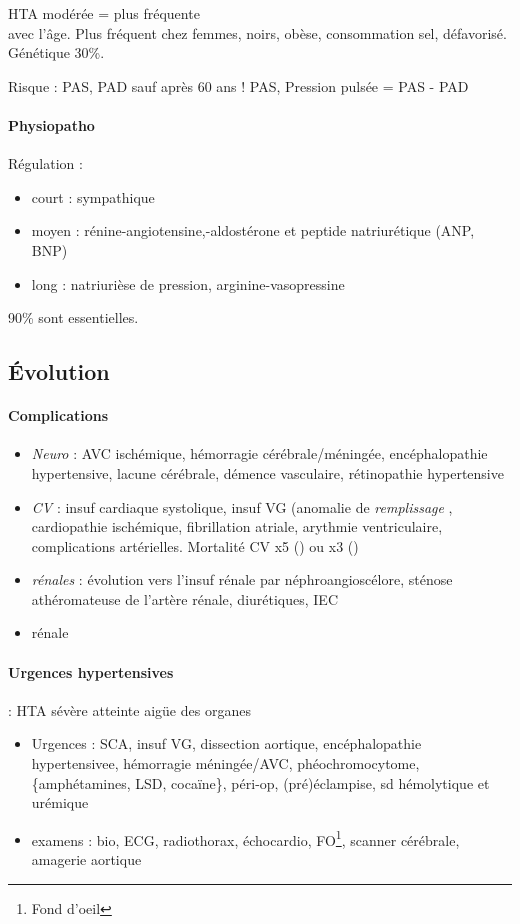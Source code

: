 \documentclass{article}
\begin{document}
HTA modérée = plus fréquente\\
\inc avec l'âge. Plus fréquent chez femmes, noirs, obèse, consommation sel,
défavorisé. Génétique 30\%.

Risque : PAS, PAD sauf après 60 ans ! PAS, Pression pulsée = PAS - PAD

\paragraph{Physiopatho}
Régulation :
\begin{itemize}
  \item court : sympathique 
  \item moyen : rénine-angiotensine,-aldostérone et peptide natriurétique (ANP,
    BNP)
  \item long : natriurièse de pression, arginine-vasopressine
\end{itemize}

90\% sont essentielles.

\subsection{Évolution}
\paragraph{Complications}
\begin{itemize}
  \item 
\textit{Neuro}  : AVC ischémique, hémorragie cérébrale/méningée, encéphalopathie
hypertensive, lacune cérébrale, démence vasculaire, rétinopathie hypertensive
\item \textit{CV}  : insuf cardiaque systolique, insuf VG (anomalie de
  \textit{remplissage} , cardiopathie ischémique, fibrillation atriale, arythmie
  ventriculaire, complications artérielles. Mortalité CV x5 (\male) ou x3 (\female)
\item \textit{rénales} : évolution vers l'insuf rénale par néphroangioscélore,
  sténose athéromateuse de l'artère rénale, diurétiques, IEC
\item rénale
\end{itemize}

\paragraph{Urgences hypertensives} : HTA sévère \land{} atteinte aigüe des organes
\begin{itemize}
  \item Urgences : SCA, insuf VG, dissection aortique, encéphalopathie
    hypertensivee, hémorragie méningée/AVC, phéochromocytome, \{amphétamines, 
    LSD, cocaïne\}, péri-op, (pré)éclampise, sd hémolytique et urémique
  \item examens : bio, ECG, radiothorax, échocardio, FO\footnote{Fond d'oeil},
    scanner cérébrale, amagerie aortique
\end{itemize}
\end{document}
